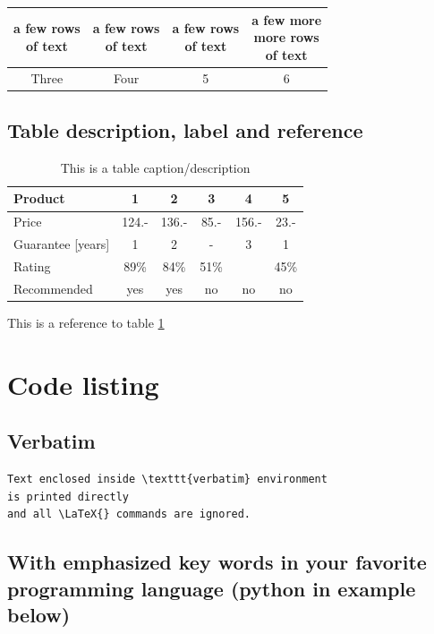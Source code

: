 \documentclass{article}
\begin{document}
\begin{center}

\begin{tabular}{|c|c|c|c|}
  \hline
\thead{a few rows\\ of text}
&   \thead{a few rows \\ of text}
&   \thead{a few rows\\ of text}
&   \thead{a few more\\ more rows\\ of text} \\
  \hline
Three & Four & 5 & 6 \\
  \hline
\end{tabular}
\end{center}

    
\subsection{Table description, label and reference}

\begin{table}[t]
\centering
\caption{This is a table caption/description}
\begin{tabular}{|l|c|c|c|c|c|}
\hline
Product & 1 & 2 & 3 & 4 & 5\\
\hline
Price & 124.- & 136.- & 85.- & 156.- & 23.-\\
Guarantee [years] & 1 & 2 & - & 3 & 1\\
Rating & 89\% & 84\% & 51\% & & 45\%\\
\hline
\hline
Recommended & yes & yes & no & no & no\\
\hline
\end{tabular}

\label{table:label}
\end{table}
This is a reference to table \ref{table:label}

\section{Code listing}

\subsection{Verbatim}
\begin{verbatim}
Text enclosed inside \texttt{verbatim} environment 
is printed directly 
and all \LaTeX{} commands are ignored.
\end{verbatim}

\subsection{With emphasized key words in your favorite programming language (python in example below)}
\end{document}
